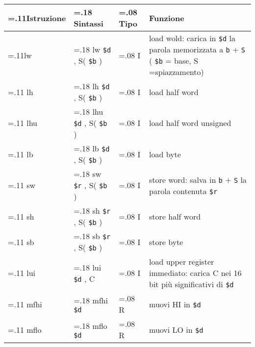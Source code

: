 \documentclass{standalone}
\newcommand\lightrule{%
	\arrayrulecolor{black!30}%
	\midrule[\lightrulewidth]%
	\arrayrulecolor{black}}
\newcommand\register[1]{%
	\texttt{#1}%
}
\begin{document}
\begin{tabularx}{\textwidth}{ >{\hsize=.11\textwidth}X >{\hsize=.18\textwidth}X >{\hsize=.08\textwidth}X X }
	\toprule
		Istruzione & Sintassi & Tipo & Funzione \\
	\midrule
		lw & lw \register{\$d}, S(\register{\$b}) & I & load wold: carica in \register{\$d} la parola memorizzata a \register{b}+\register{S} (\register{\$b} = base, S =spiazzamento) \\\lightrule
		lh & lh \register{\$d}, S(\register{\$b}) & I & load half word \\\lightrule
		lhu & lhu \register{\$d}, S(\register{\$b}) & I & load half word unsigned \\\lightrule
		lb & lb \register{\$d}, S(\register{\$b}) & I & load byte \\\lightrule
		sw & sw \register{\$r}, S(\register{\$b}) & I & store word: salva in \register{b}\(+\)\register{S} la parola contenuta \register{\$r} \\\lightrule
		sh & sh \register{\$r}, S(\register{\$b}) & I & store half word \\\lightrule
		sb & sb \register{\$r}, S(\register{\$b}) & I & store byte \\\lightrule
		lui & lui \register{\$d}, C & I &  load upper register immediato: carica C nei 16 bit più significativi di \register{\$d} \\\lightrule
		mfhi & mfhi \register{\$d} & R & muovi HI in \register{\$d} \\\lightrule
		mflo & mflo \register{\$d} & R & muovi LO in \register{\$d} \\
	\bottomrule
\end{tabularx}
\end{document}
